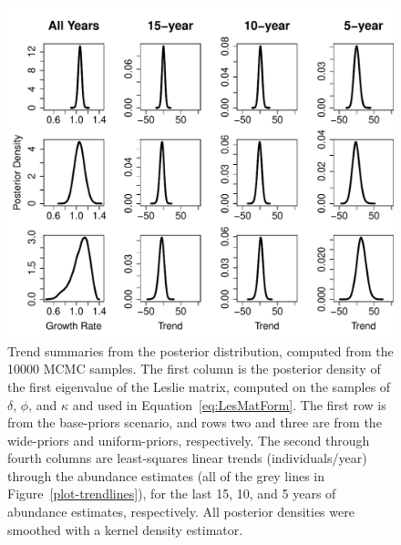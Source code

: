 \documentclass[12pt, titlepage]{article}\usepackage[]{graphicx}\usepackage[]{color}
\begin{document}

\begin{figure}[H]
\begin{center}
\includegraphics[width=0.9\linewidth]{figure/plot-histtrend-1.pdf}
\end{center}
\caption{Trend summaries from the posterior distribution, computed from the 10000 MCMC samples. The first column is the posterior density of the first eigenvalue of the Leslie matrix, computed on the samples of $\delta$, $\phi$, and $\kappa$ and used in Equation~\ref{eq:LesMatForm}.  The first row is from the base-priors scenario, and rows two and three are from the wide-priors and uniform-priors, respectively.  The second through fourth columns are least-squares linear trends (individuals/year) through the abundance estimates (all of the grey lines in Figure~\ref{plot-trendlines}), for the last 15, 10, and 5 years of abundance estimates, respectively. All posterior densities were smoothed with a kernel density estimator.  \label{plot-histtrend}}         
\end{figure}
\end{document}
